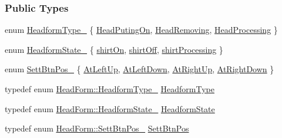 \subsubsection*{Public Types}
\begin{DoxyCompactItemize}
\item 
enum \mbox{\hyperlink{classHeadForm_ae17d4f6887245f37b3f7c002dd226dd0}{Headform\+Type\+\_\+}} \{ \mbox{\hyperlink{classHeadForm_ae17d4f6887245f37b3f7c002dd226dd0a4652ee386f0507081c73c94e23406355}{Head\+Puting\+On}}, 
\mbox{\hyperlink{classHeadForm_ae17d4f6887245f37b3f7c002dd226dd0ae0daafb321b4253abd5c15a5bee4073d}{Head\+Removing}}, 
\mbox{\hyperlink{classHeadForm_ae17d4f6887245f37b3f7c002dd226dd0a1aa31669b6be4f549f4635ab9bedf87c}{Head\+Processing}}
 \}
\item 
enum \mbox{\hyperlink{classHeadForm_ad43012a40fdd353f422cc70c37dd61f8}{Headform\+State\+\_\+}} \{ \mbox{\hyperlink{classHeadForm_ad43012a40fdd353f422cc70c37dd61f8ab400a883c6b3712cb04d90d43fc90574}{shirt\+On}}, 
\mbox{\hyperlink{classHeadForm_ad43012a40fdd353f422cc70c37dd61f8a4602d887a83fe4055d613fbe3ecb9dbc}{shirt\+Off}}, 
\mbox{\hyperlink{classHeadForm_ad43012a40fdd353f422cc70c37dd61f8af061092a97b564b96638af440f6c8e3c}{shirt\+Processing}}
 \}
\item 
enum \mbox{\hyperlink{classHeadForm_a26cd2569dd333f30e239f5ce00a267c5}{Sett\+Btn\+Pos\+\_\+}} \{ \mbox{\hyperlink{classHeadForm_a26cd2569dd333f30e239f5ce00a267c5a8964ad65c812d4a1fdd515a043281dc8}{At\+Left\+Up}}, 
\mbox{\hyperlink{classHeadForm_a26cd2569dd333f30e239f5ce00a267c5ac8f51999e1bc4dc81f2a5362246ab8cb}{At\+Left\+Down}}, 
\mbox{\hyperlink{classHeadForm_a26cd2569dd333f30e239f5ce00a267c5a50f633b215328280784cf90a9d66bf6f}{At\+Right\+Up}}, 
\mbox{\hyperlink{classHeadForm_a26cd2569dd333f30e239f5ce00a267c5ade80fd3660fc8764b6fc9a9d311b3d47}{At\+Right\+Down}}
 \}
\item typedef enum \mbox{\hyperlink{classHeadForm_ae17d4f6887245f37b3f7c002dd226dd0}{Head\+Form\+::\+Headform\+Type\+\_\+}} \mbox{\hyperlink{classHeadForm_a15bfe98cd74c9677947211a02313f7d1}{Headform\+Type}}
\item 
typedef enum \mbox{\hyperlink{classHeadForm_ad43012a40fdd353f422cc70c37dd61f8}{Head\+Form\+::\+Headform\+State\+\_\+}} \mbox{\hyperlink{classHeadForm_ae7f8ba0c9db5a5140ac4e3417dc1d9b2}{Headform\+State}}
\item 
typedef enum \mbox{\hyperlink{classHeadForm_a26cd2569dd333f30e239f5ce00a267c5}{Head\+Form\+::\+Sett\+Btn\+Pos\+\_\+}} \mbox{\hyperlink{classHeadForm_ae0ae43de172739d43f503ff0a03aad1a}{Sett\+Btn\+Pos}}
\end{DoxyCompactItemize}
